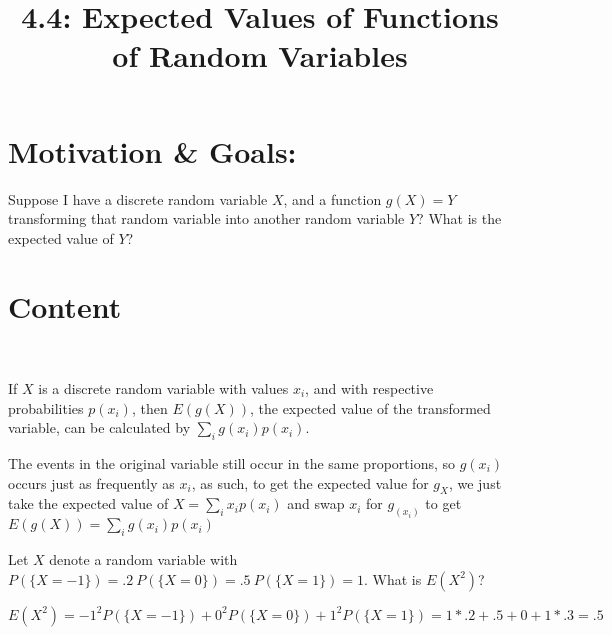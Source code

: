 \documentclass{article}
\title{4.4: Expected Values of Functions of Random Variables}
\begin{document}
\maketitle
\section{Motivation \& Goals:}
Suppose I have a discrete random variable $X$, and a function $g(X) = Y$ transforming that random variable into another random variable $Y$? What is the expected value of $Y$?

\section{Content}
\ 
\begin{proposition}
If $X$ is a discrete random variable with values $x_i$, and with respective probabilities $p(x_i)$, then $E(g(X))$, the expected value of the transformed variable, can be calculated by $\sum_{i} g(x_i)p(x_i)$.
\end{proposition}
\begin{customproof}
The events in the original variable still occur in the same proportions, so $g(x_i)$ occurs just as frequently as $x_i$, as such, to get the expected value for $g_{X}$, we just take the expected value of $X = \sum_{i}x_ip(x_i)$ and swap $x_i$ for $g_(x_i)$ to get $E(g(X)) = \sum_{i}g(x_i)p(x_i)$
\end{customproof}

\begin{example}[4a]
Let $X$ denote a random variable with $P(\{X = -1\}) = .2 \ P(\{X=0\}) = .5 \ P(\{X = 1 \}) = 1$. What is $E(X^2)$?
\end{example}

\begin{solution}
$$E(X^2) = -1^2P(\{X=-1\}) + 0^2P(\{X=0\}) + 1^2P(\{X=1\}) = 1*.2 + .5+0 + 1*.3 = .5$$
\end{solution}
\end{document}
